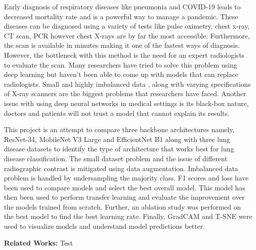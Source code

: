 \documentclass[10pt,twocolumn,letterpaper]{article}
\begin{document}
Early diagnosis of respiratory diseases like pneumonia and COVID-19 leads to decreased mortality 
rate \cite{daniel2016time} and is a powerful way to manage a pandemic\cite{xu2020facile}. 
These diseases can be diagnosed using a variety of tests like pulse oximetry, chest x-ray, 
CT scan\cite{mattsmith2022},  PCR\cite{akhtar1996pcr} however chest X-rays are by far the most 
accessible\cite{frija2021improve}. Furthermore, the scan is available in minutes making it one 
of the fastest ways of diagnosis\cite{healthwise2021}. However, the bottleneck with this method 
is the need for an expert radiologists to evaluate the scan\cite{mehrotra2009radiologists}. 
Many researchers have tried to solve this problem using deep learning \cite{wang2021deep} but 
haven't been able to come up with models that can replace radiologists. Small 
\cite{guefrechi2021deep} and highly imbalanced data \cite{wang2021deep}, along with varying 
specifications of X-ray scanners are the biggest problems \cite{melissarohman2018} that 
researchers have faced. Another issue with using deep neural networks in medical settings is 
its black-box nature\cite{paulblazek2022}, doctors and patients will not trust a model that 
cannot explain its results\cite{aleksandra2019}. 

This project is an attempt to compare three backbone architectures namely, ResNet-34, 
MobileNet V3 Large and EfficientNet B1 along with three lung disease datasets 
to identify the type of architecture that works best for lung disease classification. The 
small dataset problem and the issue of different radiographic contrast \cite{andrew2022rad} 
is mitigated using data augmentation. Imbalanced data problem is handled by undersampling the 
majority class. F1 scores and loss have been used to compare models and select the
best overall model. This model has then been used to perform transfer learning and evaluate
the improvement over the models trained from scratch. Further, an ablation study was 
performed on the best model to find the best learning rate. Finally, GradCAM and T-SNE 
were used to visualize models and understand model predictions better. 

\textbf{Related Works:} Test 



\end{document}
